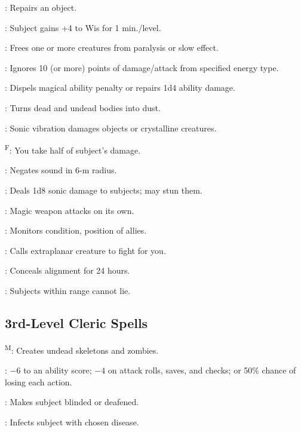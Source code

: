 : Repairs an object.

: Subject gains +4 to Wis for 1 min./level.

: Frees one or more creatures from paralysis or slow effect.

: Ignores 10 (or more) points of damage/attack from specified energy type.

: Dispels magical ability penalty or repairs 1d4 ability damage.

: Turns dead and undead bodies into dust. %

: Sonic vibration damages objects or crystalline creatures.

\textsuperscript{F}: You take half of subject's damage.

: Negates sound in 6-m radius.

: Deals 1d8 sonic damage to subjects; may stun them.

: Magic weapon attacks on its own.

: Monitors condition, position of allies.

: Calls extraplanar creature to fight for you.

: Conceals alignment for 24 hours.

: Subjects within range cannot lie.



\subsection{3rd-Level Cleric Spells}

\textsuperscript{M}: Creates undead skeletons and zombies.

: $-6$ to an ability score; $-4$ on attack rolls, saves, and checks; or 50\% chance of losing each action.

: Makes subject blinded or deafened.

: Infects subject with chosen disease.


